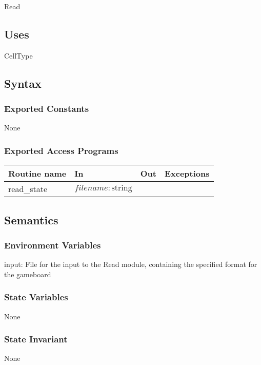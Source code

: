 \documentclass[12pt]{article}
\begin{document}
Read

\subsection* {Uses}

CellType

\subsection* {Syntax}

\subsubsection* {Exported Constants}

None

\subsubsection* {Exported Access Programs}

\begin{tabular}{| l | l | l | l |}
\hline
\textbf{Routine name} & \textbf{In} & \textbf{Out} & \textbf{Exceptions}\\
\hline
read\_state & $filename: \mbox{string}$ & ~ & ~\\
\hline
\end{tabular}

\subsection* {Semantics}

\subsubsection* {Environment Variables}

input: File for the input to the Read module, containing the specified format for the gameboard

\subsubsection* {State Variables}

None

\subsubsection* {State Invariant}

None
\end{document}
